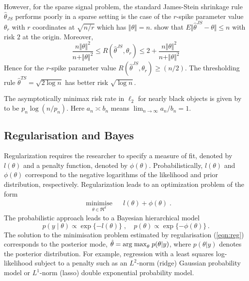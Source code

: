 \documentclass[11pt]{article}
\numberwithin{equation}{section}
\begin{document}
However, for the sparse signal problem, the standard James-Stein shrinkage rule $ \hat{\theta}_{JS} $ performs poorly in a sparse
setting is the case of the $r$-spike parameter value $ \theta_r$ with $r$ coordinates at $ \sqrt{n/r} $ which has $ \Vert \theta \Vert =n $. \citet{johnstone2004needles} show that $ E \Vert \hat{\theta}^{JS} - \theta \Vert \leq n $ with risk $2$ at the origin. Moreover, 
$$
\frac{n \Vert \theta \Vert^2}{ n + \Vert \theta \Vert^2} \leq R \left ( \hat{\theta}^{JS} , \theta_r \right ) \leq
2 + \frac{n \Vert \theta \Vert^2}{ n + \Vert \theta \Vert^2}
$$
Hence for the $r$-spike parameter value $ R \left ( \hat{\theta}^{JS} , \theta_r \right ) \geq (n/2) $. The thresholding rule  $ \hat{\theta}^{TS} = \sqrt{2 \log n} $ has better risk $ \sqrt{\log n } $.

The asymptotically minimax risk rate in $\ell_2$ for nearly black objects is given by \citet{donoho1992maximum} to be $p_n \log \left ( n / p_n \right )$. Here $a_n \asymp b_n$ means $\lim_{n\to\infty} a_n/b_n=1$. 

\subsection{Regularisation and Bayes}

Regularization requires the researcher to specify a measure of fit, denoted by $l(\theta)$ and a penalty function, denoted by $ \phi(\theta)$.
Probabilistically,  $l(\theta)$ and $\phi(\theta)$ correspond to the negative logarithms of the likelihood and prior distribution, respectively.  Regularization leads to an optimization problem of the form 
\begin{equation}
\label{eqn:reg}
\begin{aligned}
& \underset{\theta \in \Re^d}{\text{minimise}}
& & l(\theta) + \phi(\theta) \; . 
\end{aligned}
\end{equation}
The probabilistic approach leads to a Bayesian hierarchical model
$$
p(y \mid \theta) \propto \exp\{-l(\theta)\} \; , \quad p(\theta) \propto \exp\{ -\phi(\theta) \} \, .
$$ 
The solution to the minimisation problem estimated by regularisation (\ref{eqn:reg}) corresponds to the posterior mode, 
$ \hat{\theta} = {\rm arg \; max}_\theta \; p( \theta|y) $, where $ p(\theta|y)$ denotes the posterior distribution. 
For example, regression with a least squares log-likelihood 
subject to a penalty such as an $L^2$-norm (ridge) \citep{hoerl70} Gaussian probability model or $ L^1$-norm (lasso) \citep{tibshirani96} double exponential probability model. 
\end{document}
